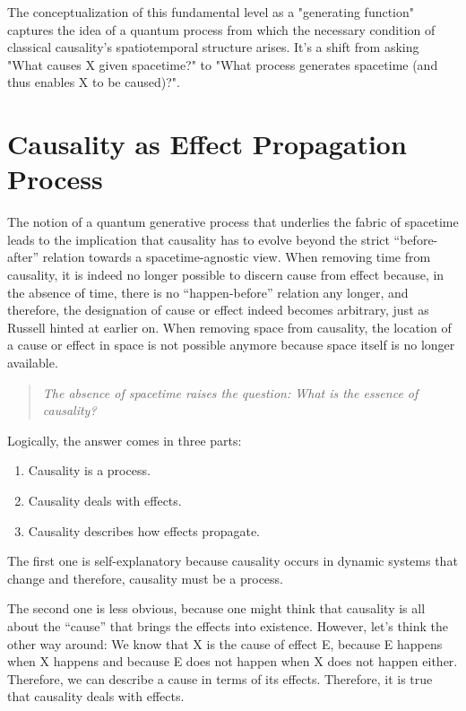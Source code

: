 \documentclass{article}
\begin{document}
The conceptualization of this fundamental level as a "generating function" captures the idea of a quantum process from which the necessary condition of classical causality's spatiotemporal structure arises. It's a shift from asking "What causes X given spacetime?" to "What process generates spacetime (and thus enables X to be caused)?".


\section{Causality as Effect Propagation Process}
\label{sec:epp}

The notion of a quantum generative process that underlies the fabric of spacetime leads to the implication that causality has to evolve beyond the strict “before-after” relation towards a spacetime-agnostic view. When removing time from causality, it is indeed no longer possible to discern cause from effect because, in the absence of time, there is no “happen-before” relation any longer, and therefore, the designation of cause or effect indeed becomes arbitrary, just as Russell hinted at earlier on.
When removing space from causality, the location of a cause or effect in space is not possible anymore because space itself is no longer available.

\begin{quote}
\begin{center}
    \textit{  
    The absence of spacetime raises the question: 
    What is the essence of causality?
  }
\end{center}
\end{quote}

Logically, the answer comes in three parts:

\begin{enumerate}
    \item Causality is a process.
    \item Causality deals with effects.
    \item Causality describes how effects propagate.
\end{enumerate}

The first one is self-explanatory because causality occurs in dynamic systems that change and therefore, causality must be a process.

The second one is less obvious, because one might think that causality is all about the “cause” that brings the effects into existence. However, let’s think the other way around: We know that X is the cause of effect E, because E happens when X happens and because E does not happen when X does not happen either. Therefore, we can describe a cause in terms of its effects. Therefore, it is true that causality deals with effects.
\end{document}
